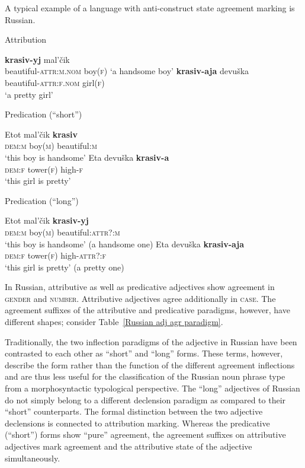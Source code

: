 A typical example of a language with anti\hyp{}construct state agreement marking is Russian.
\begin{exe}
\ex
{} \label{ru-anti}
\begin{xlist}
\ex \rm{Attribution}
\begin{xlist}
\ex	\textbf{krasiv-yj}			mal'čik\\
	beautiful-\textsc{attr:m.nom} 	boy(\textsc{f})
\glt	‘a handsome boy’
\ex
\gll 	\textbf{krasiv-aja} 			devuška\\
	beautiful-\textsc{attr:f.nom}	girl(\textsc{f})\\
\glt	 ‘a pretty girl’
\end{xlist}
\ex \rm{Predication (“short”)}
\begin{xlist}
\ex
\gll 	Etot 			mal'čik		\textbf{krasiv}\\
	\textsc{dem:m} boy(\textsc{m}) 	beautiful:\textsc{m}\\
\glt	 ‘this boy is handsome’
\ex	
\gll	Eta 			devuška		\textbf{krasiv-a}\\
	\textsc{dem:f} tower(\textsc{f}) 	high-\textsc{f}\\
\glt	‘this girl is pretty’
\end{xlist}
\ex \rm{Predication (“long”)}
\begin{xlist}
\ex
\gll 	Etot 			mal'čik		\textbf{krasiv-yj}\\
	\textsc{dem:m} boy(\textsc{m}) 	beautiful:\textsc{attr?:m}\\
\glt	 ‘this boy is handsome’ (a handsome one)
\ex	
\gll	Eta 			devuška		\textbf{krasiv-aja}\\
	\textsc{dem:f} tower(\textsc{f}) 	high-\textsc{attr?:f}\\
\glt	‘this girl is pretty’ (a pretty one)
\end{xlist}
\end{xlist}
\end{exe}
In Russian, attributive as well as predicative adjectives show agreement in \textsc{gender} and \textsc{number}. Attributive adjectives agree additionally in \textsc{case}. The agreement suffixes of the attributive and predicative paradigms, however, have different shapes; consider Table~\ref{Russian adj agr paradigm}.

Traditionally, the two inflection paradigms of the adjective in Russian have been contrasted to each other as “short” and “long” forms. These terms, however, describe the form rather than the function of the different agreement inflections and are thus less useful for the classification of the Russian noun phrase type from a morphosyntactic typological perspective. The “long” adjectives of Russian do not simply belong to a different declension paradigm as compared to their “short” counterparts. The formal distinction between the two adjective declensions is connected to attribution marking. Whereas the predicative (“short”) forms show “pure” agreement, the agreement suffixes on attributive adjectives mark agreement and the attributive state of the adjective simultaneously.

